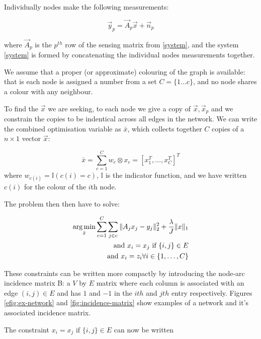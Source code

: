 \documentclass{article}
\begin{document}
Individually nodes make the following measurements:

\begin{equation}
\vec{y}_p = \vec{A}_p\vec{x} + \vec{n}_p
\end{equation}

where \(\vec{A}_p\) is the \(p^{th} \) row of the sensing matrix from \eqref{system}, and the system \eqref{system} is formed by concatenating the individual nodes measurements together.

We assume that a proper (or approximate) colouring of the graph is available: that is each node is assigned a number from a set \(C = \{1 \ldots c \} \), and no node shares a colour with any neighbour.

To find the \(\vec{x}\) we are seeking, to each node we give a copy of \(\vec{x}, \vec{x}_p\) and we constrain the copies to be indentical across all edges in the network. We can write the combined optimisation variable as \(\bar{x}\), which collects together \(C\) copies of a \(n\times 1\) vector \(\vec{x}\):

\begin{defn}
\begin{equation}
\bar{x} = \sum_{c=1}^C w_c \otimes x_c = \left[x_1^T, \ldots	, x_C^T\right]^T
\label{barxc}
\end{equation}
where \(w_{c(i)} = \mathbb{I}(c(i) = c)\), \(\mathbb{I}\) is the indicator function, and we have written \(c(i)\) for the colour of the \(i\)th node.
\end{defn}
The problem then then have to solve:

\begin{align}
\operatorname*{arg\,min}_{\bar{x}} \sum_{c=1}^C \sum_{j \in c} \|A_jx_j - y_j\|_2^2 + \frac{\lambda}{J}\|x\|_1 \nonumber \\ 
\text{ and } x_i = x_j \text{ if } \{i,j\} \in E \nonumber \\
\text{ and } x_i = z_i \forall i \in \{1, \ldots, C\}
\label{constrainedbp}
\end{align}

These constraints can be written more compactly by introducing the node-arc incidence matrix B: a \(V\) by \(E\) matrix where each column is associated with an edge \(\left(i,j\right) \in E\) and has \(1\) and \(-1\) in the \(ith\) and \(jth\) entry respectively. Figures \eqref{efig:ex-network} and \eqref{fig:incidence-matrix} show examples of a network and it's associated incidence matrix.

The constraint \(x_i = x_j \text{ if } \{i,j\} \in E \) can now be written 
\end{document}
